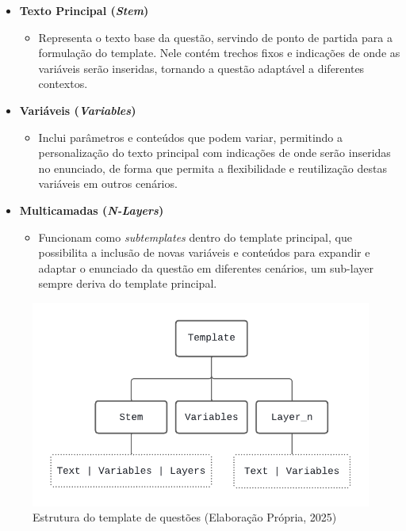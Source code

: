 \begin{itemize} \item \textbf{Texto Principal (\textit{Stem})} \begin{itemize} \item Representa o texto base da questão, servindo de ponto de partida para a formulação do template. Nele contém trechos fixos e indicações de onde as variáveis serão inseridas, tornando a questão adaptável a diferentes contextos. \end{itemize}
\item \textbf{Variáveis (\textit{Variables})}
\begin{itemize}
    \item Inclui parâmetros e conteúdos que podem variar, permitindo a personalização do texto principal com indicações de onde serão inseridas no enunciado, de forma que permita a flexibilidade e reutilização destas variáveis em outros cenários.
\end{itemize}

\item \textbf{Multicamadas (\textit{N-Layers})}
\begin{itemize}
    \item Funcionam como \textit{subtemplates} dentro do template principal, que possibilita a inclusão de novas variáveis e conteúdos para expandir e adaptar o enunciado da questão em diferentes cenários, um sub-layer sempre deriva do template principal.
    \end{itemize}
\end{itemize}


\begin{figure}[ht]
	\centering
	\includegraphics[width=14cm]{./imagens/capitulo5/template-json-example-1}
	\caption{Estrutura do template de questões (Elaboração Própria, 2025) }
	\label{fig:template-json-example-1}
\end{figure}


